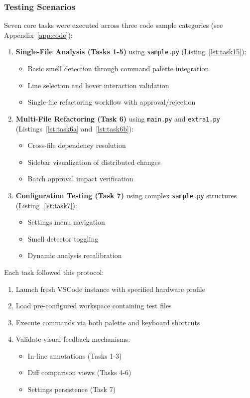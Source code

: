 \documentclass{article}
\begin{document}
\subsubsection{Testing Scenarios}
Seven core tasks were executed across three code sample categories (see Appendix~\ref{app:code}):

\begin{enumerate}
    \item \textbf{Single-File Analysis (Tasks 1-5)} using \texttt{sample.py} (Listing~\ref{lst:task15}):
    \begin{itemize}
        \item Basic smell detection through command palette integration
        \item Line selection and hover interaction validation
        \item Single-file refactoring workflow with approval/rejection
    \end{itemize}

    \item \textbf{Multi-File Refactoring (Task 6)} using \texttt{main.py} and \texttt{extra1.py} (Listings~\ref{lst:task6a} and~\ref{lst:task6b}):
    \begin{itemize}
        \item Cross-file dependency resolution
        \item Sidebar visualization of distributed changes
        \item Batch approval impact verification
    \end{itemize}

    \item \textbf{Configuration Testing (Task 7)} using complex \texttt{sample.py} structures (Listing~\ref{lst:task7}):
    \begin{itemize}
        \item Settings menu navigation
        \item Smell detector toggling
        \item Dynamic analysis recalibration
    \end{itemize}
\end{enumerate}

\noindent Each task followed this protocol:
\begin{enumerate}
    \item Launch fresh VSCode instance with specified hardware profile
    \item Load pre-configured workspace containing test files
    \item Execute commands via both palette and keyboard shortcuts
    \item Validate visual feedback mechanisms:
    \begin{itemize}
        \item In-line annotations (Tasks 1-3)
        \item Diff comparison views (Tasks 4-6)
        \item Settings persistence (Task 7)
    \end{itemize}
\end{enumerate}
\end{document}
